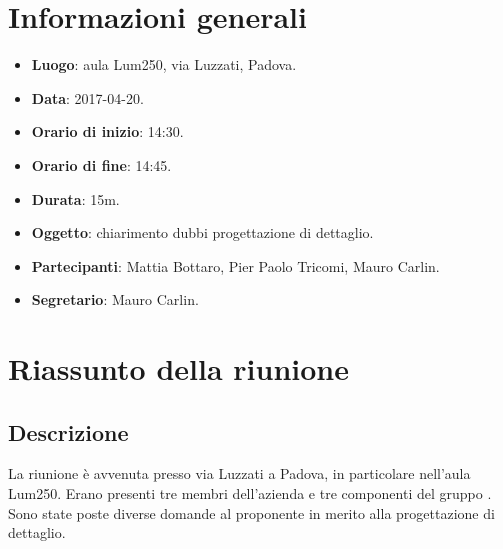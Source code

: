 \documentclass[a4paper,titlepage]{article}
\begin{document}
\maketitle
\begin{diario}
\end{diario}
\newpage
\tableofcontents

\newpage
\section{Informazioni generali}
\label{sec:Informazioni}

\begin{itemize}
  \item \textbf{Luogo}: aula Lum250, via Luzzati, Padova.
  \item \textbf{Data}: 2017-04-20.
  \item \textbf{Orario di inizio}: 14:30.
  \item \textbf{Orario di fine}: 14:45.
  \item \textbf{Durata}: 15m.
  \item \textbf{Oggetto}: chiarimento dubbi progettazione di dettaglio.
  \item \textbf{Partecipanti}: Mattia Bottaro, Pier Paolo Tricomi, Mauro Carlin.
  \item \textbf{Segretario}: Mauro Carlin.

\end{itemize}
\section{Riassunto della riunione}
\label{sec:RiassuntoRiunione}
 \subsection{Descrizione}
La riunione è avvenuta presso via Luzzati a Padova, in particolare nell'aula Lum250. Erano presenti tre membri dell'azienda  e tre componenti del gruppo \GRUPPO{}. Sono state poste diverse domande al proponente in merito alla progettazione di dettaglio.
\end{document}
